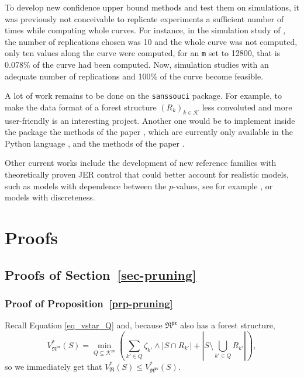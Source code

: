 \documentclass[
  11pt,
  a4paper,
]{article}
\theoremstyle{plain}
\theoremstyle{plain}
\theoremstyle{definition}
\theoremstyle{plain}
\theoremstyle{definition}
\theoremstyle{remark}
\begin{document}
To develop new confidence upper bound methods and test them on
simulations, it was previously not conceivable to replicate experiments
a sufficient number of times while computing whole curves. For instance,
in the simulation study of \citet{MR4178188}, the number of replications
chosen was 10 and the whole curve was not computed, only ten values
along the curve were computed, for an \texttt{m} set to 12800, that is
0.078\% of the curve had been computed. Now, simulation studies with an
adequate number of replications and 100\% of the curve become feasible.

A lot of work remains to be done on the \texttt{sanssouci} package. For
example, to make the data format of a forest structure
\((R_k)_{k\in\mathcal{K}}\) less convoluted and more user-friendly is an
interesting project. Another one would be to implement inside the
package the methods of the paper \citet{blain22notip}, which are
currently only available in the Python language \citep{10.5555/1593511},
and the methods of the paper \citet{JMLR:v25:23-1025}.

Other current works include the development of new reference families
with theoretically proven JER control that could better account for
realistic models, such as models with dependence between the
\(p\)-values, see for example \citet{perrot2023selective}, or models
with discreteness.

\section{Proofs}\label{sec-proofs}

\subsection{\texorpdfstring{Proofs of
Section~\ref{sec-pruning}}{Proofs of Section~}}\label{sec-pruning-proofs}

\subsubsection{\texorpdfstring{Proof of
Proposition~\ref{prp-pruning}}{Proof of Proposition~}}\label{sec-pruning-proofs-pruning}

Recall Equation \eqref{eq_vstar_Q} and, because
\(\mathfrak{R}^{\mathfrak{pr}}\) also has a forest structure,
\begin{equation}
V^*_{\mathfrak{R}^{\mathfrak{pr}}}(S)=\min_{Q\subseteq\mathcal{K}^{\mathfrak{pr}}}\left(\sum_{k'\in Q}\zeta_{k'}\wedge|S\cap R_{k'}|+\left| S\setminus\bigcup_{k'\in Q} R_{k'}   \right|\right),
\label{eq_vstarpruned_Q}
\end{equation} so we immediately get that
\(V^*_{\mathfrak{R}}(S)\leq V^*_{\mathfrak{R}^{\mathfrak{pr}}}(S)\).
\end{document}
